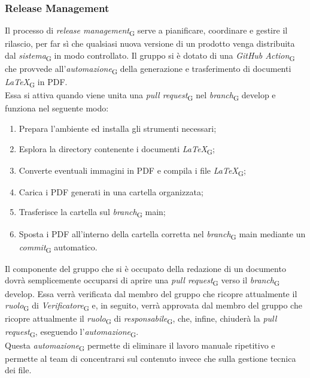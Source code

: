 \subsubsection{Release Management}
Il processo di \textit{release management}\textsubscript{G} serve a pianificare, coordinare e gestire il rilascio, per far sì che qualsiasi nuova versione di un prodotto venga distribuita dal \textit{sistema}\textsubscript{G} in modo controllato.
Il gruppo si è dotato di una \textit{GitHub Action}\textsubscript{G} che provvede all'\textit{automazione}\textsubscript{G} della generazione e trasferimento di documenti \textit{LaTeX}\textsubscript{G} in PDF.\\
Essa si attiva quando viene unita una \textit{pull request}\textsubscript{G} nel \textit{branch}\textsubscript{G} develop e funziona nel seguente modo: 
\begin{enumerate}
    \item Prepara l'ambiente ed installa gli strumenti necessari;
    \item Esplora la directory contenente i documenti \textit{LaTeX}\textsubscript{G};
    \item Converte eventuali immagini in PDF e compila i file \textit{LaTeX}\textsubscript{G};
    \item Carica i PDF generati in una cartella organizzata;
    \item Trasferisce la cartella sul \textit{branch}\textsubscript{G} main;
    \item Sposta i PDF all'interno della cartella corretta nel  \textit{branch}\textsubscript{G} main mediante un \textit{commit}\textsubscript{G} automatico.
\end{enumerate}
Il componente del gruppo che si è occupato della redazione di un documento dovrà semplicemente occuparsi di aprire una \textit{pull request}\textsubscript{G} verso il \textit{branch}\textsubscript{G} develop. Essa verrà verificata dal membro del gruppo che ricopre attualmente il \textit{ruolo}\textsubscript{G} di \textit{Verificatore}\textsubscript{G} e, in seguito, verrà approvata dal membro del gruppo che ricopre attualmente il \textit{ruolo}\textsubscript{G} di \textit{responsabile}\textsubscript{G}, che, infine, chiuderà la \textit{pull request}\textsubscript{G}, eseguendo l'\textit{automazione}\textsubscript{G}.\\
Questa \textit{automazione}\textsubscript{G} permette di eliminare il lavoro manuale ripetitivo e permette al team di concentrarsi sul contenuto invece che sulla gestione tecnica dei file.